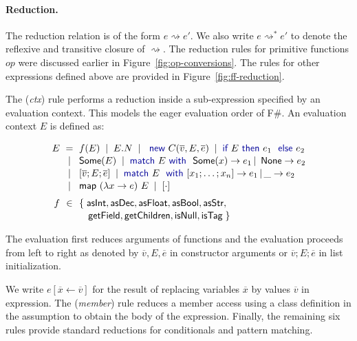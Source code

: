 \documentclass[preprint]{sigplanconf}
\newcommand{\kvd}[1]{\textnormal{\textcolor{kvdclr}{\sffamily #1}}}
\newcommand{\ident}[1]{\textnormal{\sffamily #1}}
\newcommand{\lsep}[0]{\;\; | \;\;}
\newcommand{\narrow}[1]{\hspace{-0.85em} #1 \hspace{-0.85em}}
\newcommand{\reduce}{\rightsquigarrow}
\begin{document}
\paragraph{Reduction.} The reduction relation is of the form $e \reduce e'$. We also write 
$e \reduce^{*} e'$ to denote the reflexive and transitive closure of $\reduce$. The reduction rules
for primitive functions $op$ were discussed earlier in Figure~\ref{fig:op-conversions}. The rules 
for other expressions defined above are provided in Figure~\ref{fig:ff-reduction}.

The (\emph{ctx}) rule performs a reduction inside a sub-expression specified by an evaluation context.
This models the eager evaluation order of F\#. An evaluation context $E$ is defined as:

\vspace{0.5em}
\noindent
\begin{equation*}
\begin{array}{rcl}
 E &\narrow{=}& f(E) \lsep E.N \lsep \kvd{new}~C(\overline{v}, E, \overline{e}) \lsep \kvd{if}~E~\kvd{then}~e_1~\kvd{else}~e_2 \\[0.1em]
   &\narrow{|}& \ident{Some}(E) \lsep \kvd{match}~E~\kvd{with}~\ident{Some}(x) \rightarrow e_1 \,|\, \ident{None} \rightarrow e_2 \\[0.1em]
   &\narrow{|}& [\overline{v};E;\overline{e}] \lsep \kvd{match}~E~\kvd{with}~[x_1; \ldots; x_n] \rightarrow e_1 \,|\, \_ \rightarrow e_2 \\[0.1em]
   &\narrow{|}& \ident{map}~(\lambda x\rightarrow e)~E \lsep [\cdot] 
 \\[0.6em]
 f &\narrow{\in}& \{\; \ident{asInt}, \ident{asDec}, \ident{asFloat}, \ident{asBool}, \ident{asStr}, \\[0.1em]
              && ~~\; \ident{getField}, \ident{getChildren}, \ident{isNull}, \ident{isTag} \;\}
\end{array} 
\end{equation*}

\noindent
The evaluation first reduces arguments of functions and the evaluation proceeds from left to right 
as denoted by $\overline{v}, E, \overline{e}$ in constructor arguments or $\overline{v};E;\overline{e}$
in list initialization.

We write $e[\overline{x} \leftarrow \overline{v}]$ for the result of replacing variables $\overline{x}$ by
values $\overline{v}$ in expression. The (\emph{member}) rule reduces a member access using a class 
definition in the assumption to obtain the body of the expression. Finally, the remaining six rules
provide standard reductions for conditionals and pattern matching.
\end{document}
